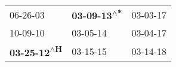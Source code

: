 \begin{supertabular}{lll}
                   06-26-03\textsuperscript{} &  \textbf{03-09-13\textsuperscript{$\wedge$*}} &  03-03-17\textsuperscript{} \\
                   10-09-10\textsuperscript{} &                    03-05-14\textsuperscript{} &  03-04-17\textsuperscript{} \\
 \textbf{03-25-12\textsuperscript{$\wedge$H}} &                    03-15-15\textsuperscript{} &  03-14-18\textsuperscript{} \\
\end{supertabular}

